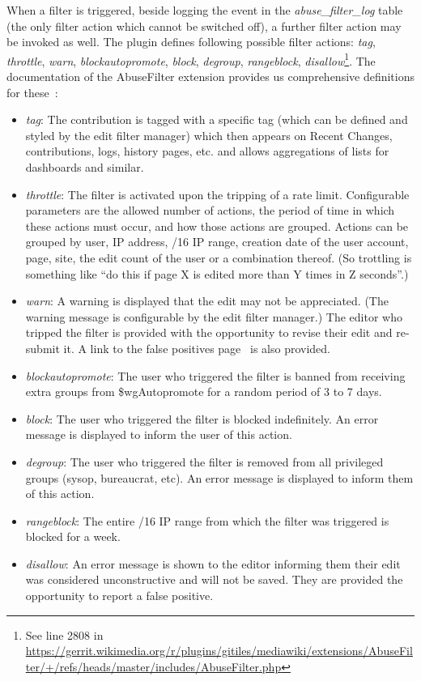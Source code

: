 When a filter is triggered, beside logging the event in the \emph{abuse\_filter\_log} table (the only filter action which cannot be switched off), a further filter action may be invoked as well.
The plugin defines following possible filter actions:
\emph{tag}, \emph{throttle}, \emph{warn}, \emph{blockautopromote}, \emph{block}, \emph{degroup}, \emph{rangeblock}, \emph{disallow}\footnote{See line 2808 in \url{https://gerrit.wikimedia.org/r/plugins/gitiles/mediawiki/extensions/AbuseFilter/+/refs/heads/master/includes/AbuseFilter.php}}.
The documentation of the AbuseFilter extension provides us comprehensive definitions for these~\cite{Mediawiki:AbuseFilterActions}:
\begin{itemize}
    \item \emph{tag}: The contribution is tagged with a specific tag (which can be defined and styled by the edit filter manager) which then appears on Recent Changes, contributions, logs, history pages, etc. and allows aggregations of lists for dashboards and similar.
    \item \emph{throttle}: The filter is activated upon the tripping of a rate limit. Configurable parameters are the allowed number of actions, the period of time in which these actions must occur, and how those actions are grouped. Actions can be grouped by user, IP address, /16 IP range, creation date of the user account, page, site, the edit count of the user or a combination thereof. (So trottling is something like ``do this if page X is edited more than Y times in Z seconds''.) %
     \item \emph{warn}: A warning is displayed that the edit may not be appreciated. (The warning message is configurable by the edit filter manager.) The editor who tripped the filter is provided with the opportunity to revise their edit and re-submit it. A link to the false positives page~\cite{Wikipedia:EditFilterFalsePositives} is also provided.
    \item \emph{blockautopromote}: The user who triggered the filter is banned from receiving extra groups from \$wgAutopromote for a random period of 3 to 7 days.
    \item \emph{block}: The user who triggered the filter is blocked indefinitely. An error message is displayed to inform the user of this action.
    \item \emph{degroup}: The user who triggered the filter is removed from all privileged groups (sysop, bureaucrat, etc). An error message is displayed to inform them of this action.
    \item \emph{rangeblock}: The entire /16 IP range from which the filter was triggered is blocked for a week.
    \item \emph{disallow}: An error message is shown to the editor informing them their edit was considered unconstructive and will not be saved. They are provided the opportunity to report a false positive.
\end{itemize}

